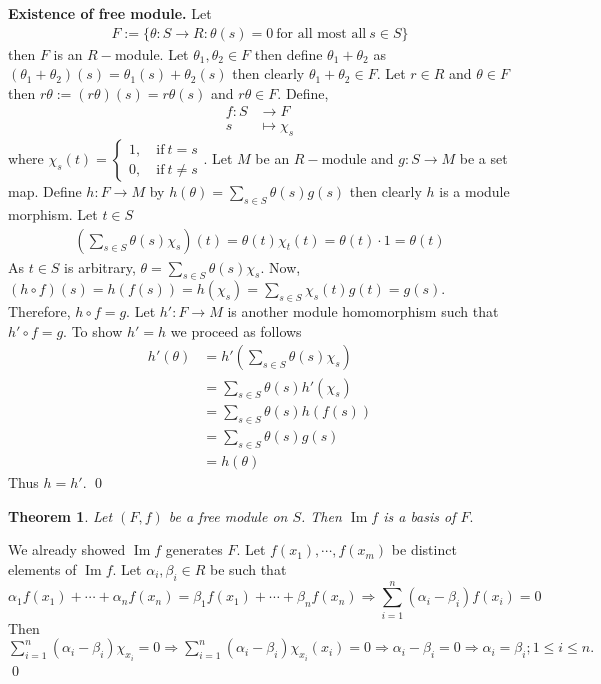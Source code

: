 \documentclass[11pt]{amsart}
\newtheorem{theorem}{Theorem}[section]
\DeclareMathOperator{\im}{\text{Im}}
\begin{document}
\textbf{Existence of free module.} Let \begin{align*}
F:=\{\theta:S\to R:\theta(s)=0~\text{for all most all}~s\in S\}
\end{align*}
then $F$ is an $R-$module. Let $\theta_1,\theta_2\in F$ then define $\theta_1+\theta_2$ as $(\theta_1+\theta_2)(s)=\theta_1(s)+\theta_2(s)$ then clearly $\theta_1+\theta_2\in F.$ Let $r\in R$ and $\theta\in F$ then $r\theta:=(r\theta)(s)=r\theta(s)$ and $r\theta\in F.$ Define, \begin{align*}
f:S&\to F\\
s&\mapsto \chi_s
\end{align*}
where $\chi_s(t)=\begin{cases}
1,\quad\text{if}~t=s\\
0,\quad\text{if}~t\neq s
\end{cases}$. Let $M$ be an $R-$module and $g:S\to M$ be a set map. Define $h:F\to M$ by $h(\theta)=\displaystyle\sum_{s\in S} \theta(s)g(s)$ then clearly $h$ is a module morphism. Let $t\in S$ \begin{align*}
\left(\displaystyle\sum_{s\in S} \theta(s)\chi_s\right)(t)=\theta(t)\chi_t(t)=\theta(t)\cdot 1=\theta(t)
\end{align*}
As $t\in S$ is arbitrary, $\theta=\displaystyle\sum_{s\in S} \theta(s)\chi_s.$ Now, $(h\circ f)(s)=h(f(s))=h(\chi_s)=\displaystyle\sum_{s\in S} \chi_s(t)g(t)=g(s).$ Therefore, $h\circ f=g.$ Let $h':F\to M$ is another module homomorphism such that $h'\circ f=g.$ To show $h'=h$ we proceed as follows \begin{align*}
h'(\theta)&=h'\left(\displaystyle\sum_{s\in S} \theta(s)\chi_s\right)\\
&=\displaystyle\sum_{s\in S} \theta(s)h'(\chi_s)\\
&=\displaystyle\sum_{s\in S} \theta(s)h(f(s))\\
&=\displaystyle\sum_{s\in S} \theta(s)g(s)\\
&=h(\theta)
\end{align*}
Thus $h=h'$. \qed
\begin{theorem}
Let $(F,f)$ be a free module on $S$. Then $\im f $ is a basis of $F.$
\end{theorem}
\proof We already showed $\im f$ generates $F.$ Let $f(x_1),\cdots,f(x_m)$ be distinct elements of $\im f$. Let $\alpha_i,\beta_i\in R$ be such that $$\alpha_1f(x_1)+\cdots+\alpha_nf(x_n)=\beta_1f(x_1)+\cdots+\beta_nf(x_n)\Rightarrow \displaystyle\sum_{i=1}^n (\alpha_i-\beta_i)f(x_i)=0$$ Then $\displaystyle\sum_{i=1}^n (\alpha_i-\beta_i)\chi_{x_i}=0 \Rightarrow \displaystyle\sum_{i=1}^n (\alpha_i-\beta_i)\chi_{x_i}(x_i)=0 \Rightarrow \alpha_i-\beta_i=0 \Rightarrow \alpha_i=\beta_i;1\leq i\leq n.$ \qed\\
\end{document}

